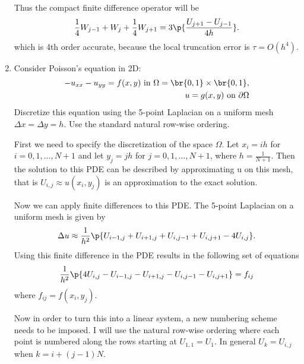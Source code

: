 \documentclass[11pt, oneside, titlepage]{article}
\begin{document}
\begin{enumerate}
        Thus the compact finite difference operator will be
        \[
            \frac{1}{4} W_{j-1} + W_j + \frac{1}{4} W_{j+1} = 3\p{\frac{U_{j+1} - U_{j-1}}{4h}}.
        \]
        which is 4th order accurate, because the local truncation error is $\tau = O(h^4)$.

    \item %
        Consider Poisson's equation in 2D:
        \begin{align*}
            -u_{xx} - u_{yy} = f(x,y)\text{ in }\Omega = \br{0,1} \times \br{0,1}, \\
            u = g(x,y)\text{ on } \partial\Omega
        \end{align*}
        Discretize this equation using the 5-point Laplacian on a uniform mesh
        $\Delta x = \Delta y = h$.
        Use the standard natural row-wise ordering.

        First we need to specify the discretization of the space $\Omega$.
        Let $x_i = ih$ for $i = 0, 1, \ldots, N+1$ and let $y_j = jh$ for
        $j = 0, 1, \ldots, N+1$, where $h = \frac{1}{N+1}$.
        Then the solution to this PDE can be described by approximating u on
        this mesh, that is $U_{i,j} \approx u(x_i, y_j)$ is an approximation
        to the exact solution.

        Now we can apply finite differences to this PDE.
        The 5-point Laplacian on a uniform mesh is given by 
        \[
            \Delta u \approx \frac{1}{h^2}\p{U_{i-1,j} + U_{i+1,j} + U_{i,j-1} + U_{i,j+1} - 4U_{i,j}}.
        \]
        Using this finite difference in the PDE results in the following set
        of equations
        \[
            \frac{1}{h^2}\p{4U_{i,j} - U_{i-1,j} - U_{i+1,j} - U_{i,j-1} - U_{i,j+1}} = f_{ij}
        \]
        where $f_{ij} = f(x_i, y_j)$.

        Now in order to turn this into a linear system, a new numbering scheme
        needs to be imposed.
        I will use the natural row-wise ordering where each point is numbered
        along the rows starting at $U_{1,1} = U_1$.
        In general $U_k = U_{i,j}$ when $k = i + (j-1)N$.


\end{enumerate}
\end{document}
